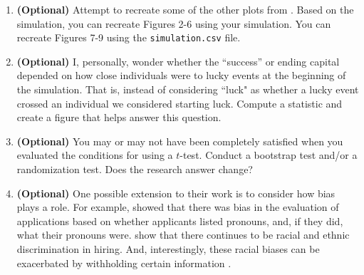 \documentclass{article}\usepackage[]{graphicx}\usepackage[]{xcolor}
\begin{document}
\begin{enumerate}
Our hypothesis test would lead us to believe that those who gain the most capital are significantly more talented than the average person. However, as shown in Figure: \ref{plot2}, the difference between the average talent from the top one percent and the normal pool of individuals is only slightly higher on visual analysis, plus, as seen in Figure: \ref{plot3}, in a single run of the simulation, the correlation between talent and capital is essentially non-existent. This leads us to the conclusion that while talent is a factor in gaining capital after repeated testing and thousands of individuals, in a single simulation, the effect of talent on capital is much less convincing, suggesting that other factors are very, if not more, important. 

\item \textbf{(Optional)} Attempt to recreate some of the other plots from \cite{Pluchino18}. Based on the simulation, you can recreate Figures 2-6 using your simulation. You can recreate Figures 7-9 using the \texttt{simulation.csv} file.
\item \textbf{(Optional)} I, personally, wonder whether the ``success'' or ending capital depended on how close individuals were to lucky events at the beginning of the simulation. That is, instead of considering ``luck" as whether a lucky event crossed an individual we considered starting luck. Compute a statistic and create a figure that helps answer this question.
\item \textbf{(Optional)} You may or may not have been completely satisfied when you evaluated the conditions for using a $t$-test. Conduct a bootstrap test and/or a randomization test. Does the research answer change?
\item \textbf{(Optional)} One possible extension to their work is to consider how bias plays a role. For example, \cite{Eames24} showed that there was bias in the evaluation of applications based on whether applicants listed pronouns, and, if they did, what their pronouns were. \cite{Gaddis21} show that there continues to be racial and ethnic discrimination in hiring. And, interestingly, these racial biases can be exacerbated by withholding certain information \citep[e.g., ban the box initiatives; see][]{Agan18}.\\


\end{enumerate}
\end{document}
